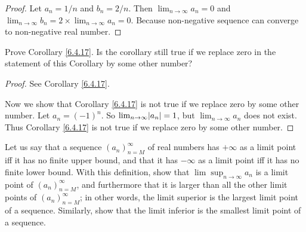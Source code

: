 \begin{proof}
Let \(a_n = 1 / n\) and \(b_n = 2 / n\).
Then \(\lim_{n \to \infty} a_n = 0\) and \(\lim_{n \to \infty} b_n = 2 \times \lim_{n \to \infty} a_n = 0\).
Because non-negative sequence can converge to non-negative real number.
\end{proof}

\begin{exercise}\label{ex 6.4.7}
Prove Corollary \ref{6.4.17}.
Is the corollary still true if we replace zero in the statement of this Corollary by some other number?
\end{exercise}

\begin{proof}
See Corollary \ref{6.4.17}.

Now we show that Corollary \ref{6.4.17} is not true if we replace zero by some other number.
Let \(a_n = (-1)^n\).
So \(\lim_{n \to \infty} \abs*{a_n} = 1\), but \(\lim_{n \to \infty} a_n\) does not exist.
Thus Corollary \ref{6.4.17} is not true if we replace zero by some other number.
\end{proof}

\begin{exercise}\label{ex 6.4.8}
Let us say that a sequence \((a_n)_{n = M}^\infty\) of real numbers has \(+\infty\) as a limit point iff it has no finite upper bound, and that it has \(-\infty\) as a limit point iff it has no finite lower bound.
With this definition, show that \(\lim\sup_{n \to \infty} a_n\) is a limit point of \((a_n)_{n = M}^\infty\), and furthermore that it is larger than all the other limit points of \((a_n)_{n = M}^\infty\);
in other words, the limit superior is the largest limit point of a sequence.
Similarly, show that the limit inferior is the smallest limit point of a sequence.
\end{exercise}

